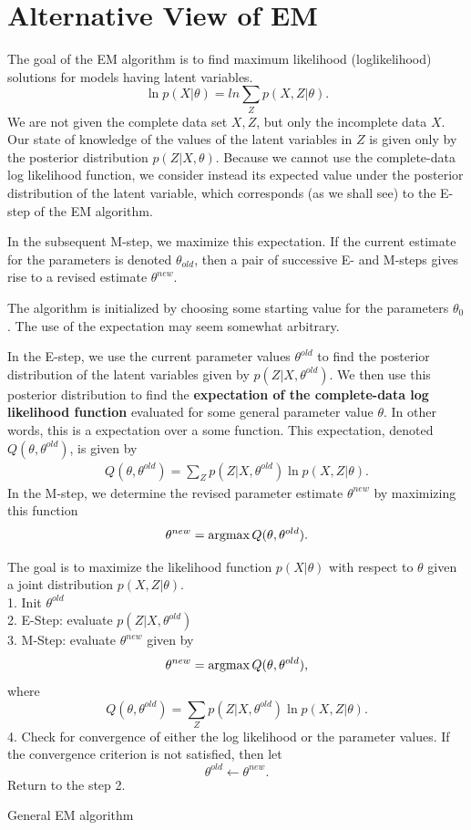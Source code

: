 \section{Alternative View of EM}
The goal of the EM algorithm is to find maximum likelihood (loglikelihood) solutions for models having latent variables.
$$\ln p(X|\theta) = ln\sum_Z p(X,Z|\theta).$$
We are not given the complete data set ${X, Z}$, but only the incomplete data $X$. Our state of knowledge of the values of the latent variables
in $Z$ is given only by the posterior distribution $p(Z|X, \theta)$. Because we cannot use the complete-data log likelihood function, we consider instead its expected value under the posterior distribution of the latent variable, which corresponds (as we shall see) to the E-step of the EM algorithm.

In the subsequent M-step, we maximize this expectation. If the current estimate for the parameters is denoted $\theta_{old}$, then a pair of successive E- and M-steps gives rise to a revised estimate $\theta^{new}$.

The algorithm is initialized by choosing some starting value for the parameters $\theta_0$. The use of the expectation may seem somewhat arbitrary.

In the E-step, we use the current parameter values $\theta^{old}$ to find the posterior distribution of the latent variables given by $p(Z|X, \theta^{old})$. We then use this posterior distribution to find the \textbf{expectation of the complete-data log likelihood function} evaluated for some general parameter value $\theta$. In other words, this is a expectation over a some function. This expectation, denoted $Q(\theta, \theta^{old})$, is given by 
\begin{align*}
	Q(\theta, \theta^{old}) = \sum_Z p(Z|X, \theta^{old})\ln p(X,Z|\theta).
\end{align*}
In the M-step, we determine the revised parameter estimate $\theta^{new}$ by maximizing this function
$$\theta^{new}=\operatorname*{\operatorname{argmax}} Q(\theta, \theta^{old}).$$


\begin{algorithm}
The goal is to maximize the likelihood function $p(X|\theta)$ with respect to $\theta$ given a joint distribution $p(X, Z|\theta)$.\\
1. Init $\theta^{old}$\\
2. E-Step: evaluate $p(Z|X, \theta^{old})$ \\
3. M-Step: evaluate $\theta^{new}$ given by 
$$\theta^{new} = \operatorname*{\operatorname{argmax}} Q(\theta, \theta^{old}),$$
where
$$Q(\theta, \theta^{old}) = \sum_Z p(Z|X, \theta^{old})\ln p(X,Z|\theta).$$
4. Check for convergence of either the log likelihood or the parameter values. If the convergence criterion is not satisfied, then let
$$\theta^{old}\leftarrow \theta^{new}.$$
Return to the step 2. 
\caption{General EM algorithm}
\end{algorithm}

